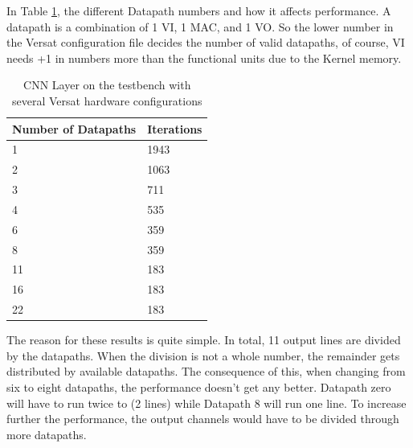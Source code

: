 In Table \ref{table:Iterations}, the different Datapath numbers and how it affects performance.
A datapath is a combination of 1 VI, 1 MAC, and 1 VO. So the lower number in the Versat configuration file
decides the number of valid datapaths, of course, VI needs +1 in numbers more than the functional units due to the Kernel memory.
\newpage
\begin{table}[!htpb]
    \centering
    \begin{tabular}{ll}
    \hline
    \textbf{Number of Datapaths} &  \textbf{Iterations}        \\ \hline
    1          & 1943                 \\
	2          & 1063                 \\
	3          & 711                 \\
	4          & 535                 \\
	6          & 359                 \\
	8          & 359                 \\
	11          & 183                 \\
	16          & 183                 \\
    22            & 183                       \\  \hline
    \end{tabular}
    \label{table:Iterations}
    \caption{CNN Layer on the testbench with several Versat hardware configurations}
\end{table}

The reason for these results is quite simple. In total, 11 output lines are divided
by the datapaths. When the division is not a whole number, the remainder gets distributed
by available datapaths. The consequence of this, when changing from six to eight datapaths, the performance
doesn't get any better. Datapath zero will have to run twice to (2 lines) while Datapath 8 will run one line.
To increase further the performance, the output channels would have to be divided through more datapaths.
